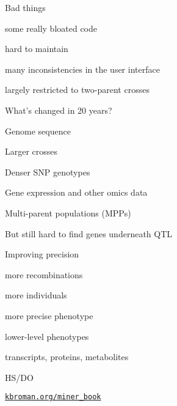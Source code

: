 \documentclass[12pt,t,aspectratio=169]{beamer}
\begin{document}
\begin{frame}{Bad things}

  \bbi
\item some really bloated code
\item hard to maintain
\item many inconsistencies in the user interface
\item largely restricted to two-parent crosses
  \ei

\end{frame}






\begin{frame}{What's changed in 20 years?}

  \bbi
\item Genome sequence
\item Larger crosses
\item Denser SNP genotypes
\item Gene expression and other omics data
\item Multi-parent populations (MPPs)
\item But still hard to find genes underneath QTL
  \ei

\end{frame}



\begin{frame}{Improving precision}

  \bbi
\item more recombinations
\item more individuals
\item more precise phenotype
\item lower-level phenotypes
\bi
\item transcripts, proteins, metabolites
  \ei
  \ei

\end{frame}



\begin{frame}[c]{HS/DO}

  \vspace{2mm}


\end{frame}





\begin{frame}[c]{}

  \vspace*{5mm}



\vspace{3mm}

\hfill \href{https://kbroman.org/miner_book}{\scriptsize \lolit \tt kbroman.org/miner\_book}

\end{frame}
\end{document}
